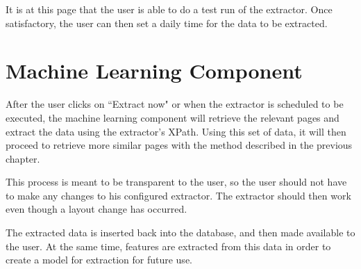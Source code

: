  It is at this page that the user is able to do a test run of the extractor. Once satisfactory,
 the user can then set a daily time for the data to be extracted.
 

\section{Machine Learning Component}
After the user clicks on ``Extract now" or when the extractor is scheduled to be executed, the
machine learning component will retrieve the relevant pages and extract the data using the
extractor's XPath. Using this set of data, it will then proceed to retrieve more similar pages
with the method described in the previous chapter.

This process is meant to be transparent to the user, so the user should not have to make
any changes to his configured extractor. The extractor should then work even though a layout 
change has occurred.


	The extracted data is inserted back into the database, and then made available to the user.
At the same time, features are extracted from this data in order to create a model for
extraction for future use. 